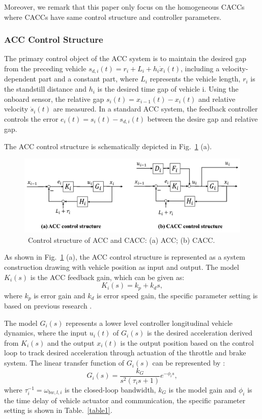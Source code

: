 \documentclass[a4paper,fleqn]{cas-sc}
\begin{document}
Moreover, we remark that this paper only focus on the homogeneous CACCs where CACCs have same control structure and controller parameters.


\subsubsection{ACC Control Structure}
\label{Section 2.3.1}
The primary control object of the ACC system is to maintain the desired gap from the preceding vehicle $s_{d, i}(t)=r_{i}+L_{i}+h_{i} \dot{x}_{i}(t)$, including a velocity-dependent part and a constant part, where $L_i$ represents the vehicle length, $r_i$ is the standstill distance and $h_i$ is the desired time gap of vehicle i. Using the onboard sensor, the relative gap $s_{i}(t)=x_{i-1}(t)-x_{i}(t)$ and relative velocity $\dot{s}_{i} (t)$ are measured. In a standard ACC system, the feedback controller controls the error $e_{i}(t)=s_{i}(t)-s_{d, i}(t)$ between the desire gap and relative gap.

The ACC control structure is schematically depicted in Fig.~\ref{fig2} (a).

\begin{figure}
  \centering
  \includegraphics[width=14cm]{figs/fig2.png}
  \caption{~Control structure of ACC and CACC: (a) ACC; (b) CACC.}
  \label{fig2}
\end{figure}

As shown in Fig.~\ref{fig2} (a), the ACC control structure is represented as a system construction drawing with vehicle position as input and output. The model $K_i (s)$ is the ACC feedback gain, which can be given as:
\begin{equation}
  K_{i}(s)=k_{p}+k_{d} s,
\end{equation}
where $k_p$ is error gain and $k_d$ is error speed gain, the specific parameter setting is based on previous research \citep{milanes2014modeling,milanes2013cooperative}.

The model $G_i (s)$ represents a lower level controller longitudinal vehicle dynamics, where the input $u_i (t)$ of $G_i (s)$ is the desired acceleration derived from $K_i (s)$ and the output $x_i (t)$ is the output position based on the control loop to track desired acceleration through actuation of the throttle and brake system. The linear transfer function of $G_i (s)$ can be represented by \citep{ploeg2013lp}:
\begin{equation}
  G_{i}(s)=\frac{k_{G}}{s^{2}\left(\tau_{i} s+1\right)} e^{-\phi_{i} s},
\end{equation}
where $\tau_{i}^{-1}=\omega_{b w, l, i}$ is the closed-loop bandwidth, $k_G$ is the model gain and $\phi_{i}$ is the time delay of vehicle actuator and communication, the specific parameter setting is shown in Table.~\ref{table1}.
\end{document}
